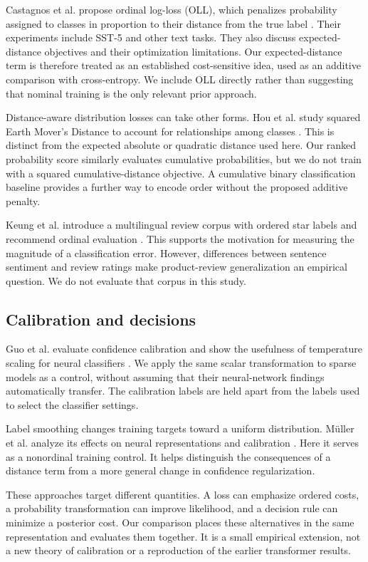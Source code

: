 \documentclass[10pt,twocolumn]{article}
\begin{document}
Castagnos et al. propose ordinal log-loss (OLL), which penalizes probability assigned to classes in proportion to their distance from the true label \cite{castagnos2022}. Their experiments include SST-5 and other text tasks. They also discuss expected-distance objectives and their optimization limitations. Our expected-distance term is therefore treated as an established cost-sensitive idea, used as an additive comparison with cross-entropy. We include OLL directly rather than suggesting that nominal training is the only relevant prior approach.

Distance-aware distribution losses can take other forms. Hou et al. study squared Earth Mover's Distance to account for relationships among classes \cite{hou2016}. This is distinct from the expected absolute or quadratic distance used here. Our ranked probability score similarly evaluates cumulative probabilities, but we do not train with a squared cumulative-distance objective. A cumulative binary classification baseline provides a further way to encode order without the proposed additive penalty.

Keung et al. introduce a multilingual review corpus with ordered star labels and recommend ordinal evaluation \cite{keung2020}. This supports the motivation for measuring the magnitude of a classification error. However, differences between sentence sentiment and review ratings make product-review generalization an empirical question. We do not evaluate that corpus in this study.

\subsection{Calibration and decisions}
Guo et al. evaluate confidence calibration and show the usefulness of temperature scaling for neural classifiers \cite{guo2017}. We apply the same scalar transformation to sparse models as a control, without assuming that their neural-network findings automatically transfer. The calibration labels are held apart from the labels used to select the classifier settings.

Label smoothing changes training targets toward a uniform distribution. M\"uller et al. analyze its effects on neural representations and calibration \cite{muller2019}. Here it serves as a nonordinal training control. It helps distinguish the consequences of a distance term from a more general change in confidence regularization.

These approaches target different quantities. A loss can emphasize ordered costs, a probability transformation can improve likelihood, and a decision rule can minimize a posterior cost. Our comparison places these alternatives in the same representation and evaluates them together. It is a small empirical extension, not a new theory of calibration or a reproduction of the earlier transformer results.
\end{document}
